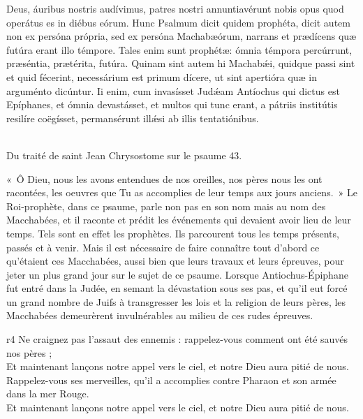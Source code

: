 \documentclass[twoside]{article}
\begin{document}
\begin{paracol}[1]{2}
{		Deus, áuribus nostris audívimus, patres nostri annuntiavérunt nobis opus quod operátus es in diébus eórum. Hunc Psalmum dicit quidem prophéta, dicit autem non ex persóna própria, sed ex persóna Machabæórum, narrans et prædícens quæ futúra erant illo témpore. Tales enim sunt prophétæ: ómnia témpora percúrrunt, præséntia, prætérita, futúra. Quinam sint autem hi Machabǽi, quidque passi sint et quid fécerint, necessárium est primum dícere, ut sint apertióra quæ in arguménto dicúntur. Ii enim, cum invasísset Judǽam Antíochus qui dictus est Epíphanes, et ómnia devastásset, et multos qui tunc erant, a pátriis institútis resilíre coëgísset, permansérunt illǽsi ab illis tentatiónibus.
	}
	{
		~\\Du traité de saint Jean Chrysostome sur le psaume 43.
	
		«~Ô Dieu, nous les avons entendues de nos oreilles, nos pères nous les ont racontées, les oeuvres que Tu as accomplies de leur temps aux jours anciens.~» Le Roi-prophète, dans ce psaume, parle non pas en son nom mais au nom des Macchabées, et il raconte et prédit les événements qui devaient avoir lieu de leur temps. Tels sont en effet les prophètes. Ils parcourent tous les temps présents, passés et à venir. Mais il est nécessaire de faire connaître tout d'abord ce qu'étaient ces Macchabées, aussi bien que leurs travaux et leurs épreuves, pour jeter un plus grand jour sur le sujet de ce psaume. Lorsque Antiochus-Épiphane fut entré dans la Judée, en semant la dévastation sous ses pas, et qu'il eut forcé un grand nombre de Juifs à transgresser les lois et la religion de leurs pères, les Macchabées demeurèrent invulnérables au milieu de ces rudes épreuves.}
	{r4}
	{\rr Ne craignez pas l’assaut des ennemis : rappelez-vous comment ont été sauvés nos pères ;\\
	\GreSpecial{*} Et maintenant lançons notre appel vers le ciel, et notre Dieu aura pitié de nous.\\
	\vv Rappelez-vous ses merveilles, qu’il a accomplies contre Pharaon et son armée dans la mer Rouge.\\
	\GreSpecial{*} Et maintenant lançons notre appel vers le ciel, et notre Dieu aura pitié de nous.}


\end{paracol}
\end{document}
